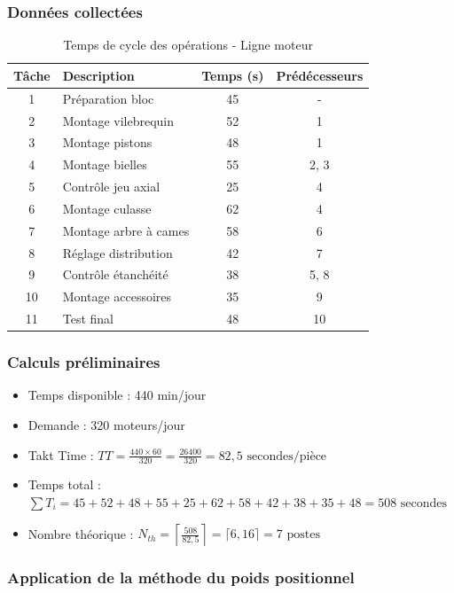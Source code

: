 \documentclass[12pt,a4paper]{article}
\begin{document}
\begin{center}
\subsubsection{Données collectées}

\begin{table}[H]
\centering
\caption{Temps de cycle des opérations - Ligne moteur}
\label{tab:auto_temps}
\begin{tabular}{|c|l|c|c|}
\hline
\textbf{Tâche} & \textbf{Description} & \textbf{Temps (s)} & \textbf{Prédécesseurs} \\ \hline
1 & Préparation bloc & 45 & - \\
2 & Montage vilebrequin & 52 & 1 \\
3 & Montage pistons & 48 & 1 \\
4 & Montage bielles & 55 & 2, 3 \\
5 & Contrôle jeu axial & 25 & 4 \\
6 & Montage culasse & 62 & 4 \\
7 & Montage arbre à cames & 58 & 6 \\
8 & Réglage distribution & 42 & 7 \\
9 & Contrôle étanchéité & 38 & 5, 8 \\
10 & Montage accessoires & 35 & 9 \\
11 & Test final & 48 & 10 \\
\hline
\end{tabular}
\end{table}

\subsubsection{Calculs préliminaires}

\begin{itemize}
    \item Temps disponible : 440 min/jour
    \item Demande : 320 moteurs/jour
    \item Takt Time : \(TT = \frac{440 \times 60}{320} = \frac{26400}{320} = 82,5 \text{ secondes/pièce}\)
    \item Temps total : \(\sum T_i = 45+52+48+55+25+62+58+42+38+35+48 = 508 \text{ secondes}\)
    \item Nombre théorique : \(N_{th} = \left\lceil \frac{508}{82,5} \right\rceil = \lceil 6,16 \rceil = 7 \text{ postes}\)
\end{itemize}

\subsubsection{Application de la méthode du poids positionnel}


\end{center}
\end{document}
